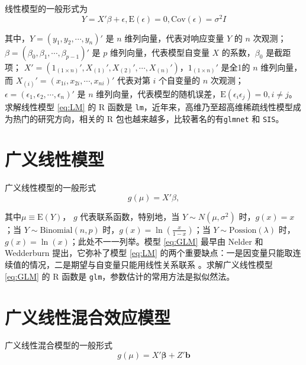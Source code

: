 \documentclass[hyperref, a4paper, UTF8, zihao = -4, linespread = 1.25, scheme = chinese]{ctexbook}
\begin{document}
线性模型的一般形式为\begin{equation}
Y = X'\beta + \epsilon, \mathrm{E}(\epsilon) = 0, \mathrm{Cov}(\epsilon) = \sigma^2I  \label{eq:LM}
\end{equation}

其中，\(Y = (y_1,y_2,\cdots,y_n)'\) 是 \(n\) 维列向量，代表对响应变量
\(Y\) 的 \(n\) 次观测；
\(\beta = (\beta_0,\beta_1,\cdots,\beta_{p-1})'\) 是 \(p\)
维列向量，代表模型自变量 \(X\) 的系数，\(\beta_0\) 是截距项；
\(X' = (1_{(1\times n)}',X_{(1)}',X_{(2)}',\cdots,X_{(n)}')\)，\(1_{(1\times n)}'\)
是全1的 \(n\) 维列向量，而 \(X_{(i)}' = (x_{1i},x_{2i},\cdots,x_{ni})'\)
代表对第 \(i\) 个自变量的 \(n\) 次观测；
\(\epsilon = (\epsilon_1,\epsilon_2,\cdots,\epsilon_n)'\) 是 \(n\)
维列向量，代表模型的随机误差，\(\mathrm{E}(\epsilon_i \epsilon_j) = 0, i \ne j\)。
求解线性模型 \eqref{eq:LM} 的 R 函数是
\texttt{lm}，近年来，高维乃至超高维稀疏线性模型成为热门的研究方向，相关的
R 包也越来越多，比较著名的有\texttt{glmnet}\citep{glmnet2011JSS} 和
\texttt{SIS}\citep{SIS2016JSS}。

\section{广义线性模型}

广义线性模型的一般形式\begin{equation}
g(\mu) = X'\beta,  \label{eq:GLM}
\end{equation}

其中\(\mu \equiv \mathrm{E}(Y)\)， \(g\) 代表联系函数，特别地，当
\(Y \sim N(\mu,\sigma^2)\) 时，\(g(x) = x\) ；当
\(Y \sim \mathrm{Binomial}(n,p)\) 时，\(g(x)=\ln(\frac{x}{1-x})\)；当
\(Y \sim \mathrm{Possion}(\lambda)\)
时，\(g(x) = \ln(x)\)；此处不一一列举\citep{McCullagh1989}。模型
\eqref{eq:GLM} 最早由 Nelder 和 Wedderburn
\citep{Nelder1972}提出，它弥补了模型 \eqref{eq:LM}
的两个重要缺点：一是因变量只能取连续值的情况，二是期望与自变量只能用线性关系联系
\citep{Chen2011}。求解广义线性模型 \eqref{eq:GLM} 的 R 函数是
\texttt{glm}，参数估计的常用方法是拟似然法。

\section{广义线性混合效应模型}

广义线性混合模型的一般形式\begin{equation}
g(\mu) = X'\boldsymbol{\beta} + Z'\mathbf{b}  \label{eq:GLMM}
\end{equation}
\end{document}
